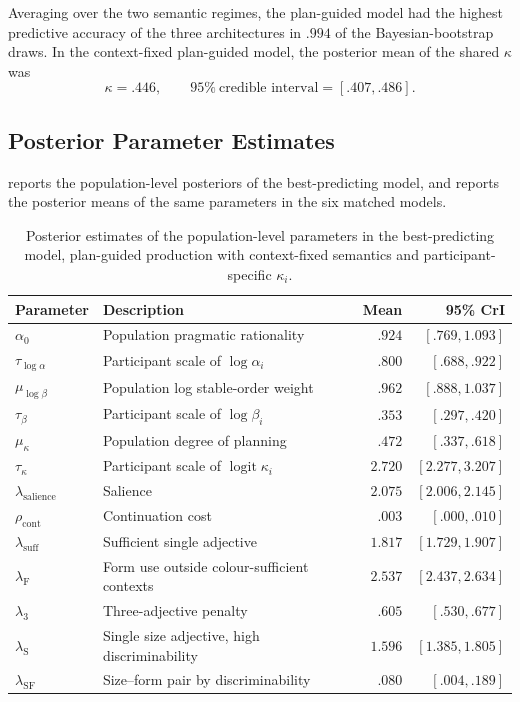 \documentclass[10pt,a4paper,fleqn]{article}
\begin{document}
Averaging over the two semantic regimes, the plan-guided model had the highest predictive accuracy of the three architectures in $.994$ of the Bayesian-bootstrap draws.
In the context-fixed plan-guided model, the posterior mean of the shared $\kappa$ was
\begin{equation}
  \kappa=.446,
  \qquad 95\%~\text{credible interval}=[.407,.486].
  \label{eq:kappa-result}
\end{equation}

\subsection{Posterior Parameter Estimates}
\label{sec:appendix:posterior-parameters}

 reports the population-level posteriors of the best-predicting model, and  reports the posterior means of the same parameters in the six matched models.

\begin{table}[H]
\centering
\caption{Posterior estimates of the population-level parameters in the best-predicting model, plan-guided production with context-fixed semantics and participant-specific $\kappa_i$.}
\label{tab:posterior-best}
\footnotesize
\begin{tabularx}{\textwidth}{l X r r}
\toprule
Parameter & Description & Mean & 95\% CrI \\
\midrule
$\alpha_0$ & Population pragmatic rationality & $.924$ & $[.769,1.093]$ \\
$\tau_{\log\alpha}$ & Participant scale of $\log\alpha_i$ & $.800$ & $[.688,.922]$ \\
$\mu_{\log\beta}$ & Population log stable-order weight & $.962$ & $[.888,1.037]$ \\
$\tau_\beta$ & Participant scale of $\log\beta_i$ & $.353$ & $[.297,.420]$ \\
$\mu_\kappa$ & Population degree of planning & $.472$ & $[.337,.618]$ \\
$\tau_\kappa$ & Participant scale of $\operatorname{logit}\kappa_i$ & $2.720$ & $[2.277,3.207]$ \\
$\lambda_{\mathrm{salience}}$ & Salience & $2.075$ & $[2.006,2.145]$ \\
$\rho_{\mathrm{cont}}$ & Continuation cost & $.003$ & $[.000,.010]$ \\
$\lambda_{\mathrm{suff}}$ & Sufficient single adjective & $1.817$ & $[1.729,1.907]$ \\
$\lambda_{\mathrm{F}}$ & Form use outside colour-sufficient contexts & $2.537$ & $[2.437,2.634]$ \\
$\lambda_{3}$ & Three-adjective penalty & $.605$ & $[.530,.677]$ \\
$\lambda_{\mathrm{S}}$ & Single size adjective, high discriminability & $1.596$ & $[1.385,1.805]$ \\
$\lambda_{\mathrm{SF}}$ & Size--form pair by discriminability & $.080$ & $[.004,.189]$ \\
\bottomrule
\end{tabularx}
\end{table}
\end{document}
